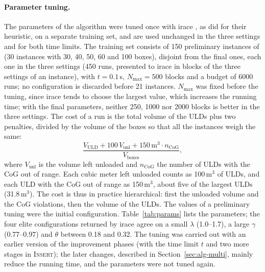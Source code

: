 \paragraph{Parameter tuning.}
The parameters of the algorithm were tuned once with irace \citep{LopezIbanez2016}, as
\citet{Paquay2018b} did for their heuristic, on a separate training set, and are used unchanged
in the three settings and for both time limits. The training set consists of 150 preliminary
instances of \citet{Paquay2018b} (30 instances with 30, 40, 50, 60 and 100 boxes), disjoint
from the final ones, each one in the three settings (450 runs, presented to irace in blocks of
the three settings of an instance), with $t = 0.1$\,s, $N_{\max} = 500$ blocks and a budget of 6000 runs; no configuration is
discarded before 21 instances. $N_{\max}$ was fixed before the tuning, since irace tends to choose
the largest value, which increases the running time; with the final parameters, neither 250,
1000 nor 2000 blocks is better in the three settings. The cost of a run is the total volume of the ULDs plus two
penalties, divided by the volume of the boxes so that all the instances weigh the same:
\[
\frac{V_{\mathrm{ULD}} + 100\, V_{\mathrm{unl}} + 150\,\mathrm{m}^3 \cdot n_{\mathrm{CoG}}}{V_{\mathrm{boxes}}},
\]
where $V_{\mathrm{unl}}$ is the volume left unloaded and $n_{\mathrm{CoG}}$ the number of ULDs
with the CoG out of range. Each cubic meter left unloaded counts as 100\,m$^3$ of ULDs, and each
ULD with the CoG out of range as 150\,m$^3$, about five of the largest ULDs (31.8\,m$^3$). The
cost is thus in practice hierarchical: first the unloaded volume and the CoG violations, then the
volume of the ULDs. The values of a preliminary tuning were the initial
configuration. Table~\ref{tab:params} lists the parameters; the four elite
configurations returned by irace agree on a small $\lambda$ (1.0--1.7), a large $\gamma$
(0.77--0.97) and $\theta$ between 0.18 and 0.32. The tuning was carried out with an earlier version of the
improvement phases (with the time limit $t$ and two more stages in \textsc{Insert}); the later
changes, described in Section~\ref{sec:alg-multi}, mainly reduce the running time, and the
parameters were not tuned again.

